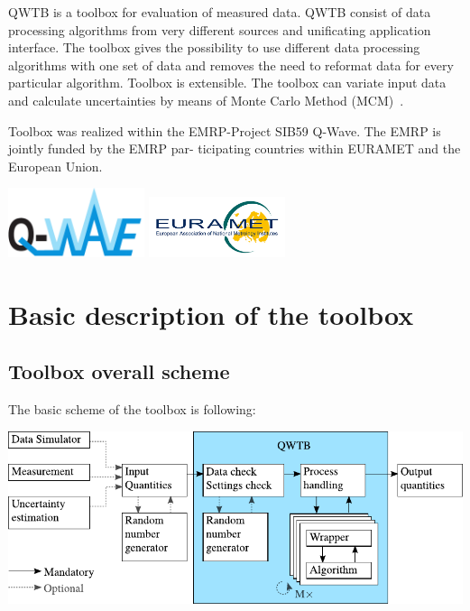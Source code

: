 \documentclass[12pt,a4paper,oneside]{report} %
\begin{document}
\bigskip
\noindent QWTB is a toolbox for evaluation of measured data. QWTB consist of data
processing algorithms from very different sources and unificating application interface. The toolbox
gives the possibility to use different data processing algorithms with one set of data and removes
the need to reformat data for every particular algorithm. Toolbox is extensible. The toolbox
can variate input data and calculate uncertainties by means of Monte Carlo Method
(MCM)~\cite{JCGM2008}.

Toolbox was realized within the EMRP-Project SIB59 Q-Wave. The EMRP is jointly funded by the EMRP
par- ticipating countries within EURAMET and the European Union.

\vfill
\includegraphics[width=0.3\textwidth]{sources/Q-Wave_logo_01.pdf}
\hfill
\includegraphics[width=0.3\textwidth]{sources/eurametlogo.jpg}


\chapter{Basic description of the toolbox} %
\section{Toolbox overall scheme} %
The basic scheme of the toolbox is following:
\begin{center}
        \includegraphics{sources/basic scheme v2.pdf}
\end{center}
\end{document}
